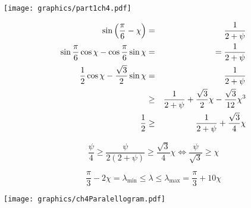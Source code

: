 \begin{minipage}{\linewidth}
\begin{center}
\texttt{[image: graphics/part1ch4.pdf]}
\label{fig:part1ch4.pdf}
\end{center}
\end{minipage}
\begin{eqnarray*}
\sin \left( \frac{\pi}{6}- \chi \right) &=& \frac{1}{2+ \psi}\\
\sin \frac{\pi}{6} \cos \chi - \cos \frac{\pi}{6} \sin \chi &=& = \frac{1}{2+\psi}\\
\frac{1}{2} \cos \chi - \frac{\sqrt{3}}{2} \sin \chi &=& \frac{1}{2+\psi}\\
&\geq& \frac{1}{2+\psi} + \frac{\sqrt{3}}{2} \chi - \frac{\sqrt{3}}{12} \chi^3 \\
\frac{1}{2} &\geq&  \frac{1}{2+\psi} + \frac{\sqrt{3}}{4} \chi\\
\end{eqnarray*}

$$\frac{\psi}{4} \geq \frac{\psi}{2 (2 + \psi)}\geq \frac{\sqrt{3}}{4} \chi\iff \frac{\psi}{\sqrt{3}} \geq \chi$$

$$\frac{\pi}{3} - 2 \chi = \lambda_\text{min} \leq \lambda \leq \lambda_\text{max} = \frac{\pi}{3} + 10 \chi$$


\begin{minipage}{\linewidth}
\begin{center}
\texttt{[image: graphics/ch4Paralellogram.pdf]}
\label{fig:ch4Paralellogram.pdf}
\end{center}
\end{minipage}